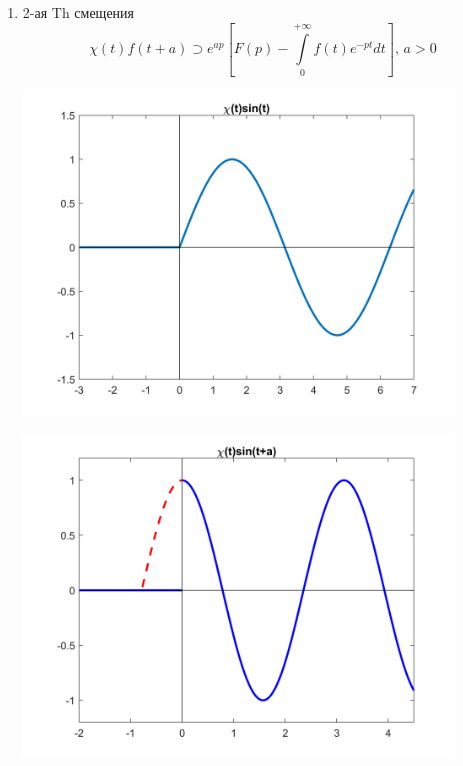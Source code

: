 \documentclass[oneside, final, 12pt]{article}
\def\lftKul{\supset}
\theoremstyle{def}
\begin{document}
\begin{enumerate}
\begin{enumerate}
$$\begin{gathered}
					 				\text{Мы знаем преобразования для $\chi(t)$,} \\
					 				\text{а у нас все с $a$ начинается здесь.} \\
					 				\text{Аккуратно с $\chi(t)$\textbf{!},}\\
					 				\text{нужно смотреть на аргумент.} 
					 				\,
					 			\end{gathered}  \quad
					 	\right] 
			 		$$ 
			 	\item 2-ая Th смещения \vspace{1mm} \newline
			 		$$
			 			\chi(t)f(t+a)  \lftKul e^{ap}\left[ F(p) - \int\limits_{0}^{+\infty} f(t) e^{-pt}dt \right],\,  a>0
			 		$$
			 		
			 		\begin{minipage}{0.45\textwidth}	
			 			\includegraphics[width=0.9\textwidth]{pict/hev_pict.png}
			 		\end{minipage} \vspace{3mm}
			 			\hfill
					\begin{minipage}{0.45\textwidth}	
			 			\includegraphics[width=0.9\textwidth]{pict/prop_2_2.png}

\end{minipage}
\end{enumerate}
\end{enumerate}
\end{document}
